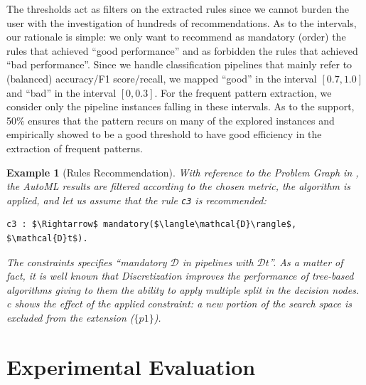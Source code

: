 \documentclass[5p,times]{elsarticle}
\newtheorem{example}{Example}
\newcommand{\mf}[1]{#1}
\begin{document}
\mf{
The thresholds act as filters on the extracted rules since we cannot burden the user with the investigation of hundreds of recommendations. 
As to the intervals, our rationale is simple: we only want to recommend as mandatory (order) the rules that achieved ``good performance'' and as forbidden the rules that achieved ``bad performance''.
Since we handle classification pipelines that mainly refer to (balanced) accuracy/F1 score/recall, we mapped ``good'' in the interval $[0.7, 1.0]$ and ``bad'' in the interval $[0, 0.3]$. For the frequent pattern extraction, we consider only the pipeline instances falling in these intervals.
As to the support, 50\% ensures that the pattern recurs on many of the explored instances and empirically showed to be a good threshold to have good efficiency in the extraction of frequent patterns.
}

\begin{example}[Rules Recommendation]
With reference to the Problem Graph in ,
the AutoML results are filtered according to the chosen metric, the algorithm \cite{raschkas_2018_mlxtend} is applied, and let us assume that the rule \texttt{c3} is recommended:
\begin{lstlisting}[mathescape=true]
c3 : $\Rightarrow$ mandatory($\langle\mathcal{D}\rangle$, $\mathcal{D}t$).
\end{lstlisting}
The constraints specifies ``mandatory $\mathcal{D}$ in pipelines with $\mathcal{D}t$''.
As a matter of fact, it is well known that Discretization improves the performance of tree-based algorithms giving to them the ability to apply multiple split in the decision nodes.
c shows the effect of the applied constraint: a new portion of the search space is excluded from the extension ($\{p1\}$).
\end{example}




\section{Experimental Evaluation}\label{sec:test}
\end{document}
